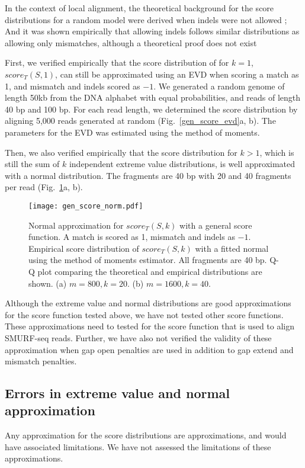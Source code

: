 In the context of local alignment, the theoretical background for the
score distributions for a random model were derived when indels were not
allowed \citep{}; And it was shown empirically that allowing indels
follows similar distributions as allowing only mismatches, although a
theoretical proof does not exist \citep{}

First, we verified empirically that the score distribution of for $k=1$,
$score_T(S,1)$, can still be approximated using an EVD when scoring a
match as 1, and mismatch and indels scored as $-1$. We generated a random
genome of length 50kb from the DNA alphabet with equal probabilities,
and reads of length 40 bp and 100 bp. For each read length, we
determined the score distribution by aligning 5,000 reads generated at
random (Fig.~\ref{gen_score_evd}a, b). The parameters for the EVD was
estimated using the method of moments.

Then, we also verified empirically that the score distribution for $k >
1$, which is still the sum of $k$ independent extreme value
distributions, is well approximated with a normal distribution. The
fragments are 40 bp with 20 and 40 fragments per read
(Fig.~\ref{gen_score_norm}a, b).

\begin{figure}[t!]
\centering
\texttt{[image: gen\_score\_norm.pdf]}
\caption[Normal approximation for $score_T(S,k)$ with a general score
  function]{
  Normal approximation for $score_T(S,k)$ with a general score function.
  A match is scored as 1, mismatch and indels as $-1$.
  Empirical score distribution of $score_T(S,k)$ with a fitted
  normal using the method of moments estimator. All fragments are 40 bp.
  Q-Q plot comparing the theoretical and empirical distributions are shown.
  (a) $m=800, k=20$.
  (b) $m=1600, k=40$.}
\label{gen_score_norm}
\end{figure}

Although the extreme value and normal distributions are good
approximations for the score function tested above, we have not tested
other score functions. These approximations need to tested for the score
function that is used to align SMURF-seq reads. Further, we have also
not verified the validity of these approximation when gap open penalties
are used in addition to gap extend and mismatch penalties.

\subsection*{Errors in extreme value and normal approximation}
Any approximation for the score distributions are approximations, and
would have associated limitations. We have not assessed the limitations
of these approximations.

